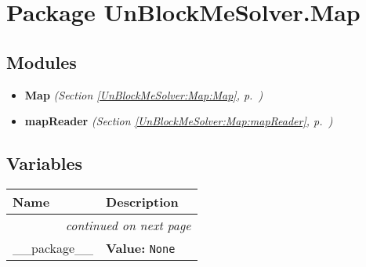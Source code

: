 %
%
%


\section{Package UnBlockMeSolver.Map}

    \label{UnBlockMeSolver:Map}


\subsection{Modules}

\begin{itemize}
\setlength{\parskip}{0ex}
\item \textbf{Map}
  \textit{(Section \ref{UnBlockMeSolver:Map:Map}, p.~\pageref{UnBlockMeSolver:Map:Map})}

\item \textbf{mapReader}
  \textit{(Section \ref{UnBlockMeSolver:Map:mapReader}, p.~\pageref{UnBlockMeSolver:Map:mapReader})}

\end{itemize}



  \subsection{Variables}

    \vspace{-1cm}
\hspace{\varindent}\begin{longtable}{|p{\varnamewidth}|p{\vardescrwidth}|l}
\cline{1-2}
\cline{1-2} \centering \textbf{Name} & \centering \textbf{Description}& \\
\cline{1-2}
\endhead\cline{1-2}\multicolumn{3}{r}{\small\textit{continued on next page}}\\\endfoot\cline{1-2}
\endlastfoot\raggedright \_\-\_\-p\-a\-c\-k\-a\-g\-e\-\_\-\_\- & \raggedright \textbf{Value:} 
{\tt None}&\\
\cline{1-2}
\end{longtable}

